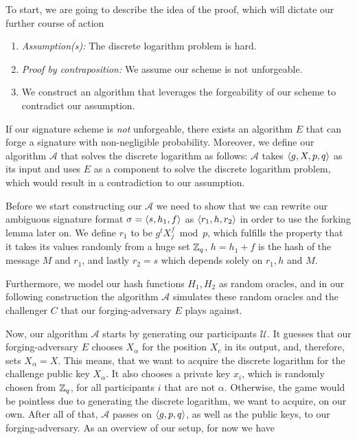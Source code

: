 To start, we are going to describe the idea of the proof, which will dictate our further course of action

\begin{enumerate}[1.)]
  \item \textit{Assumption(s):} The discrete logarithm problem is hard.
  \item \textit{Proof by contraposition:} We assume our scheme is not unforgeable.
  \item We construct an algorithm that leverages the forgeability of our scheme to contradict our assumption. 
\end{enumerate}
%
If our signature scheme is \textit{not} unforgeable, there exists an algorithm \(E\) that can forge a signature with non-negligible probability.
Moreover, we define our algorithm \(\mathcal{A}\) that solves the discrete logarithm as follows:
\(\mathcal{A}\) takes \(\langle g,X,p,q \rangle\) as its input and uses \(E\) as a component to solve the discrete logarithm problem, which would result in a contradiction to our assumption.

Before we start constructing our \(\mathcal{A}\) we need to show that we can rewrite our ambiguous signature format \(\sigma = \langle s,h_1, f \rangle\) as \(\langle r_1, h, r_2 \rangle\) in order to use the forking lemma later on.
We define \(r_1\) to be \(g^t X_j^f \bmod p\), which fulfills the property that it takes its values randomly from a huge set \(\mathbb{Z}_q\), \(h = h_1 + f\) is the hash of the message \(M\) and \(r_1\), and lastly \(r_2 = s\) which depends solely on \(r_1, h\) and \(M\).

Furthermore, we model our hash functions \(H_1, H_2\) as random oracles, and in our following construction the algorithm \(\mathcal{A}\) simulates these random oracles and the challenger \(C\) that our forging-adversary \(E\) plays against.

Now, our algorithm \(\mathcal{A}\) starts by generating our participants \(\mathcal{U}\). It guesses that our forging-adversary \(E\) chooses \(X_\alpha\) for the position \(X_c\) in its output, and, therefore, sets \(X_\alpha = X\).
This means, that we want to acquire the discrete logarithm for the challenge public key \(X_\alpha\).
It also chooses a private key \(x_i\), which is randomly chosen from \(\mathbb{Z}_q\), for all participants \(i\) that are not \(\alpha\).
Otherwise, the game would be pointless due to generating the discrete logarithm, we want to acquire, on our own.
After all of that, \(\mathcal{A}\) passes on \(\langle g,p,q \rangle\), as well as the public keys, to our forging-adversary.
As an overview of our setup, for now we have 

